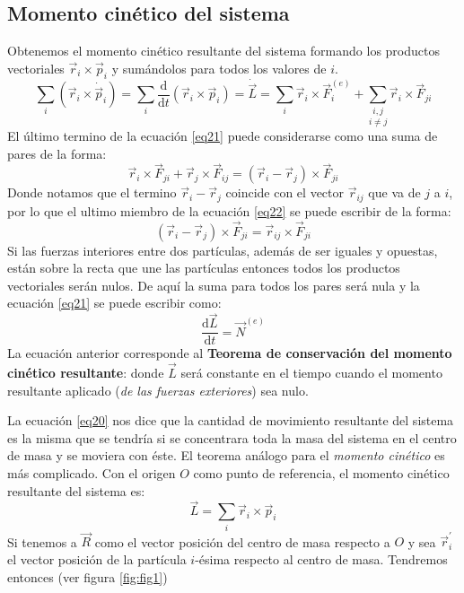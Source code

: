 \documentclass[../main]{subfiles}
\begin{document}
\subsection*{Momento cinético del sistema}
    Obtenemos el momento cinético resultante del sistema formando los productos vectoriales $\vec{r}_i \times \vec{p}_i$ y sumándolos para todos los valores de $i$. 
    \begin{equation}
        \sum_i \left( \vec{r}_i \times \dot{\vec{p}}_i \right)=\sum_i \dfrac{\text{d}}{\text{d}t}\left( \vec{r}_i \times \vec{p}_i \right)=\dot{\vec{L}}=\sum_i \vec{r}_i \times \vec{F}_i^{(e)}+\underset{i \neq j}{\sum_{i,j}} \vec{r}_i \times \vec{F}_{ji}
        \label{eq21}
    \end{equation}
El último termino de la ecuación \eqref{eq21} puede considerarse como una suma de pares de la forma:
    \begin{equation}
        \vec{r}_i \times \vec{F}_{ji}+\vec{r}_j \times \vec{F}_{ij}=(\vec{r}_i-\vec{r}_j) \times \vec{F}_{ji}
        \label{eq22}
    \end{equation}
Donde notamos que el termino $\vec{r}_i-\vec{r}_j$ coincide con el vector $\vec{r}_{ij}$ que va de $j$ a $i$, por lo que el ultimo miembro de la ecuación \eqref{eq22} se puede escribir de la forma:
    \begin{equation}
        (\vec{r}_i-\vec{r}_j) \times \vec{F}_{ji}=\vec{r}_{ij} \times \vec{F}_{ji}
        \label{eq23}
    \end{equation}
Si las fuerzas interiores entre dos partículas, además de ser iguales y opuestas, están sobre la recta que une las partículas entonces todos los productos vectoriales serán nulos. De aquí la suma para todos los pares será nula y la ecuación \eqref{eq21} se puede escribir como:
    \begin{equation}
        \dfrac{\text{d}\vec{L}}{\text{d}t}=\vec{N}^{(e)}
        \label{eq24}
    \end{equation}
La ecuación anterior corresponde al \textbf{Teorema de conservación del momento cinético resultante}: donde $\vec{L}$ será constante en el tiempo cuando el momento resultante aplicado (\textit{de las fuerzas exteriores}) sea nulo.
    \vspace{0.2cm}
    
La ecuación \eqref{eq20} nos dice que la cantidad de movimiento resultante del sistema es la misma que se tendría si se concentrara toda la masa del sistema en el centro de masa y se moviera con éste. El teorema análogo para el \textit{momento cinético} es más complicado. Con el origen $O$ como punto de referencia, el momento cinético resultante del sistema es:
    \begin{equation*}
        \vec{L}=\sum_i \vec{r}_i \times \vec{p}_i
    \end{equation*}
Si tenemos a $\vec{R}$ como el vector posición del centro de masa respecto a $O$ y sea $\vec{r}_i^{'}$ el vector posición de la partícula $i$-ésima respecto al centro de masa. Tendremos entonces (ver figura \ref{fig:fig1})
    
\end{document}
